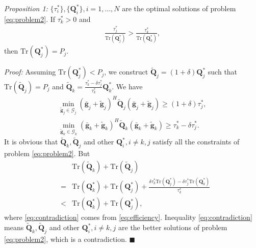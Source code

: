\documentclass[journal]{IEEEtran}
\begin{document}
\emph{Proposition 1:} $\{\tau_i^*\}, \{\mathbf{Q}_i^*\}, i = 1, \ldots, N$ are the optimal solutions of problem \eqref{eq:problem2}. If $\tau_k^* > 0$ and
\begin{eqnarray}
\frac{\tau_j^*}{\mathrm{Tr}(\mathbf{Q}_j^*)} > \frac{\tau_k^*}{\mathrm{Tr}(\mathbf{Q}_k^*)} \label{eq:efficiency},
\end{eqnarray}
then $\mathrm{Tr}(\mathbf{Q}_j^*) = P_j$.

\emph{Proof:} Assuming $\mathrm{Tr}(\mathbf{Q}_j^*) < P_j$, we construct $\tilde{\mathbf{Q}}_j = (1 + \delta) \mathbf{Q}_j^*$ such that $\mathrm{Tr}(\tilde{\mathbf{Q}}_j) = P_j$ and $\tilde{\mathbf{Q}}_k = \frac{\tau_k^* - \delta\tau_j^*}{\tau_k^*} \mathbf{Q}_k^*$. We have
\begin{eqnarray}
\min_{\tilde{\mathbf{g}}_j \in \mathcal{G}_j}(\bar{\mathbf{g}}_j+\tilde{\mathbf{g}}_j)^H\tilde{\mathbf{Q}}_j(\bar{\mathbf{g}}_j+\tilde{\mathbf{g}}_j)\geq (1+ \delta)\tau_j^*,\nonumber\\
\min_{\tilde{\mathbf{g}}_k \in \mathcal{G}_k}(\bar{\mathbf{g}}_k+\tilde{\mathbf{g}}_k)^H\tilde{\mathbf{Q}}_k(\bar{\mathbf{g}}_k+\tilde{\mathbf{g}}_k) \geq \tau_k^* - \delta\tau_j^*. \nonumber
\end{eqnarray}
It is obvious that $\tilde{\mathbf{Q}}_k, \tilde{\mathbf{Q}}_j$ and other $\mathbf{Q}_i^*, i \neq k,j$ satisfy all the constraints of problem \eqref{eq:problem2}. But
\begin{eqnarray}
&&\mathrm{Tr}(\tilde{\mathbf{Q}}_k) + \mathrm{Tr}(\tilde{\mathbf{Q}}_j) \nonumber\\
&=&\mathrm{Tr}(\mathbf{Q}_k^*) + \mathrm{Tr}(\mathbf{Q}_j^*) + \frac{\delta\tau_k^*\mathrm{Tr}(\mathbf{Q}_j^*)-\delta\tau_j^*\mathrm{Tr}(\mathbf{Q}_k^*)}{\tau_k^*} \nonumber\\
&<&\mathrm{Tr}(\mathbf{Q}_k^*) + \mathrm{Tr}(\mathbf{Q}_j^*), \label{eq:contradiction}
\end{eqnarray}
where \eqref{eq:contradiction} comes from  \eqref{eq:efficiency}.
Inequality \eqref{eq:contradiction} means $\tilde{\mathbf{Q}}_k, \tilde{\mathbf{Q}}_j$ and other $\mathbf{Q}_i^*, i \neq k,j$ are the better solutions of problem \eqref{eq:problem2}, which is a contradiction. \hfill$\blacksquare$
\end{document}
